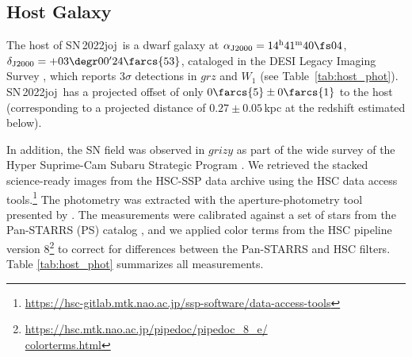 \documentclass[twocolumn]{aastex631}
\newcommand{\sn}{SN\,2022joj}
\begin{document}
\begin{CJK*}{UTF8}{gbsn}
\subsection{Host Galaxy}\label{sec:host}
The host of \sn\ is a dwarf galaxy at $\alpha_\mathrm{J2000}=14^\mathrm{h}41^\mathrm{m}40\fs04$, $\delta_\mathrm{J2000}=+03\degr00'24\farcs{53}$, cataloged in the DESI Legacy Imaging Survey \citep[LS;][]{Dey_LS_2019}, which reports 3$\sigma$ detections in $grz$ and $W_1$ (see Table~\ref{tab:host_phot}). \sn\ has a projected offset of only $0\farcs{5}\pm0\farcs{1}$ to the host (corresponding to a projected distance of $0.27\pm0.05$\,kpc at the redshift estimated below). 

In addition, the SN field was observed in $grizy$ as part of the wide survey of the Hyper Suprime-Cam Subaru Strategic Program \citep[HSC-SSP;][]{Aihara2018a}. We retrieved the stacked science-ready images from the HSC-SSP data archive using the HSC data access tools.\footnote{\href{https://hsc-gitlab.mtk.nao.ac.jp/ssp-software/data-access-tools}{https://hsc-gitlab.mtk.nao.ac.jp/ssp-software/data-access-tools}} The photometry was extracted with the aperture-photometry tool presented by \citet{Schulze2018a}. The measurements were calibrated against a set of stars from the Pan-STARRS (PS) catalog \citep{PS1_2016}, and we applied color terms from the HSC pipeline version 8\footnote{\href{https://hsc.mtk.nao.ac.jp/pipedoc/pipedoc_8_e/colorterms.html}{https://hsc.mtk.nao.ac.jp/pipedoc/pipedoc\_8\_e/\\colorterms.html}} to correct for differences between the Pan-STARRS and HSC filters. Table \ref{tab:host_phot} summarizes all measurements.


\end{CJK*}
\end{document}
